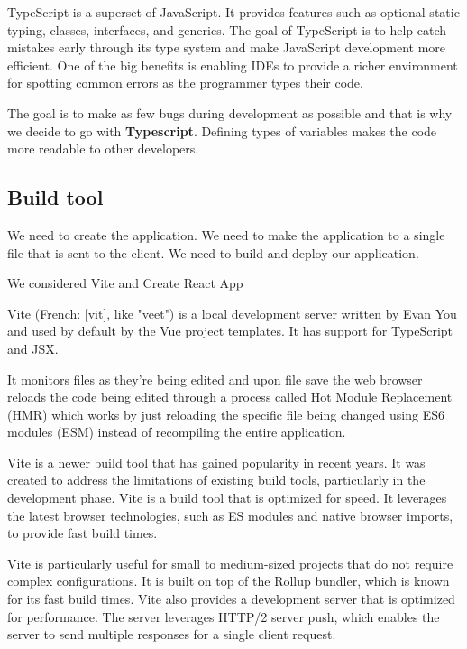   TypeScript is a superset of JavaScript. 
  It provides features such as optional static typing, classes, interfaces, and generics. 
  The goal of TypeScript is to help catch mistakes early through its type system and make JavaScript development more efficient. 
  One of the big benefits is enabling IDEs to provide a richer environment for spotting common errors as the programmer types their code.

  The goal is to make as few bugs during development as possible and that is why we decide to go with \textbf{Typescript}.
  Defining types of variables makes the code more readable to other developers.

\subsection*{Build tool}
  We need to create the application.
  We need to make the application to a single file that is sent to the client.
  We need to build and deploy our application.

  We considered Vite and Create React App

  Vite (French: [vit], like "veet") is a local development server written by Evan You and used by default by the Vue project templates. It has support for TypeScript and JSX.

  It monitors files as they're being edited and upon file save the web browser reloads the code being edited through a process called Hot Module Replacement (HMR) which works by just reloading the specific file being changed using ES6 modules (ESM) instead of recompiling the entire application.

  Vite is a newer build tool that has gained popularity in recent years. It was created to address the limitations of existing build tools, particularly in the development phase. Vite is a build tool that is optimized for speed. It leverages the latest browser technologies, such as ES modules and native browser imports, to provide fast build times.

  Vite is particularly useful for small to medium-sized projects that do not require complex configurations. It is built on top of the Rollup bundler, which is known for its fast build times. Vite also provides a development server that is optimized for performance. The server leverages HTTP/2 server push, which enables the server to send multiple responses for a single client request.

